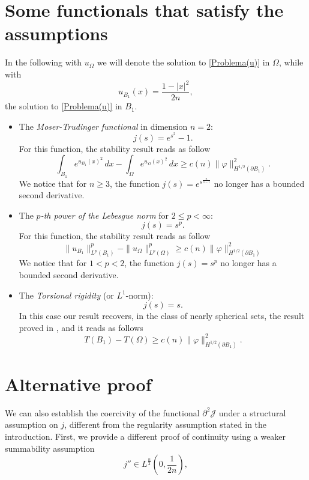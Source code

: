 \documentclass[oneside,a4paper,11pt,notitlepage]{article}
\theoremstyle{definition}
\theoremstyle{plain}
\theoremstyle{definition}
\begin{document}
\section{Some functionals that satisfy the assumptions}\label{listafunzione}
In the following with $u_\Omega$ we will denote the solution to \eqref{Problema(u)} in $\Omega$, while with
\begin{equation*}
    u_{B_1}(x)=\frac{1-|x|^2}{2n},
\end{equation*}
the solution to \eqref{Problema(u)} in $B_1$.
\begin{itemize}
    \item The \emph{Moser-Trudinger functional} in dimension $n=2$:
    \[ j(s)=e^{s^2}-1.\]
    For this function, the stability result reads as follow
    \begin{equation*}
        \int_{B_1}e^{u_{B_1}(x)^2}\,dx-\int_\Omega e^{u_\Omega(x)^2}\,dx\geq c(n)\|\varphi\|_{H^{1/2}(\partial B_1)}^2.
    \end{equation*}
    We notice that for $n\geq3$, the function $j(s)=e^{s^\frac{n}{n-1}}$ no longer has a bounded second derivative.
    \item The \emph{$p$-th power of the Lebesgue norm} for $2\leq p<\infty$:
    \[j(s)=s^p.\]
    For this function, the stability result reads as follow
    \begin{equation*}
        \|u_{B_1}\|_{L^p(B_1)}^p-\|u_\Omega\|_{L^p(\Omega)}^p\geq c(n)\|\varphi\|_{H^{1/2}(\partial B_1)}^2
    \end{equation*}
    We notice that for $1<p<2$, the function $j(s)=s^p$ no longer has a bounded second derivative.
    \item The \emph{Torsional rigidity} (or $L^1$-norm):
    \[j(s)=s.\]
    In this case our result recovers, in the class of nearly spherical sets, the result proved in \cite{BDPV}, and it reads as follows
    \begin{equation*}
        T(B_1)-T(\Omega)\geq c(n)\|\varphi\|_{H^{1/2}(\partial B_1)}^2.
    \end{equation*}
\end{itemize}

\section{Alternative proof}\label{alternative}
We can also establish the coercivity of the functional $\partial^2\mathcal{J}$ under a structural assumption on $j$, different from the regularity assumption stated in the introduction. First, we provide a different proof of continuity using a weaker summability assumption
\begin{equation}\label{Integrabilita j''}
    j''\in L^{\frac n2}\!\left(0,\frac{1}{2n}\right),
\end{equation}
\end{document}
